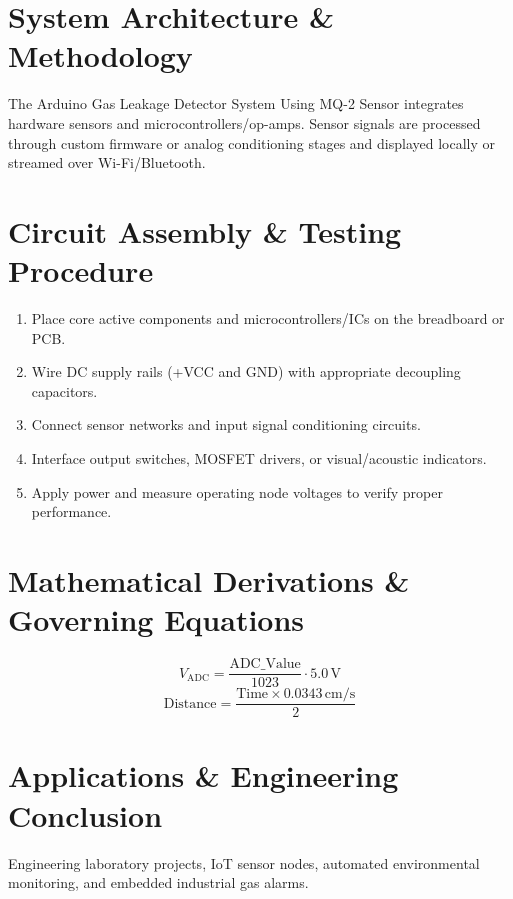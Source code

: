 \documentclass[11pt,a4paper]{article}
\begin{document}
\section{System Architecture \& Methodology}
The Arduino Gas Leakage Detector System Using MQ-2 Sensor integrates hardware sensors and microcontrollers/op-amps. Sensor signals are processed through custom firmware or analog conditioning stages and displayed locally or streamed over Wi-Fi/Bluetooth.

\section{Circuit Assembly \& Testing Procedure}
\begin{enumerate}
    \item Place core active components and microcontrollers/ICs on the breadboard or PCB.
    \item Wire DC supply rails (+VCC and GND) with appropriate decoupling capacitors.
    \item Connect sensor networks and input signal conditioning circuits.
    \item Interface output switches, MOSFET drivers, or visual/acoustic indicators.
    \item Apply power and measure operating node voltages to verify proper performance.
\end{enumerate}

\section{Mathematical Derivations \& Governing Equations}
\begin{equation}
V_{\text{ADC}} = \frac{\text{ADC\_Value}}{1023} \cdot 5.0\,\text{V}
\end{equation}
\begin{equation}
\text{Distance} = \frac{\text{Time} \times 0.0343\,\text{cm/s}}{2}
\end{equation}

\section{Applications \& Engineering Conclusion}
Engineering laboratory projects, IoT sensor nodes, automated environmental monitoring, and embedded industrial gas alarms.
\end{document}
